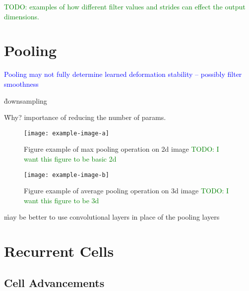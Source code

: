\textcolor{green}{TODO: examples of how different filter values and strides can effect the output dimensions.}




\section{Pooling}


\textcolor{blue}{Pooling may not fully determine learned deformation stability -- possibly filter smoothness\cite{ruderman2018learned}}

\r{downsampling}

\r{Why? importance of reducing the number of params.}




\begin{figure}[htp]
	\centering
	\texttt{[image: example-image-a]}\hfil
	\caption{Figure example of max pooling operation on 2d image \textcolor{green}{TODO: I want this figure to be basic 2d}}
	\label{fig:pooling_max_2d_ex_a}
\end{figure}

\begin{figure}[htp]
	\centering
	\texttt{[image: example-image-b]}\hfil
	\caption{Figure example of average pooling operation on 3d image \textcolor{green}{TODO: I want this figure to be 3d}}
	\label{fig:pooling_avg_3d_ex_a}
\end{figure}


\r{may be better to use convolutional layers in place of the pooling layers\cite{springenberg2014striving}}

\section{Recurrent Cells}


\subsection{Cell Advancements}

